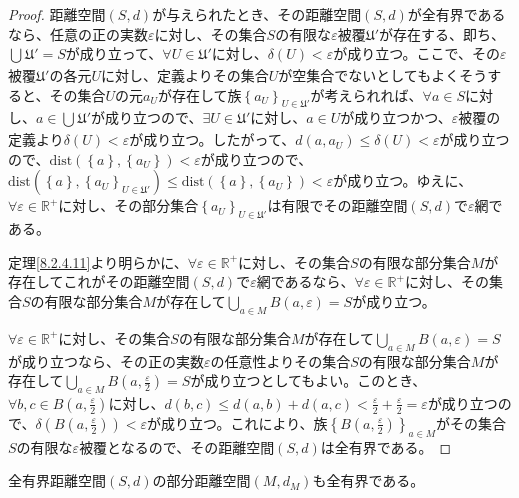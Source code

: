 \documentclass[dvipdfmx]{jsarticle}
\begin{document}
\begin{proof}
距離空間$(S,d)$が与えられたとき、その距離空間$(S,d)$が全有界であるなら、任意の正の実数$\varepsilon$に対し、その集合$S$の有限な$\varepsilon$被覆$\mathfrak{U}'$が存在する、即ち、$\bigcup_{} \mathfrak{U}' = S$が成り立って、$\forall U \in \mathfrak{U}'$に対し、$\delta(U) < \varepsilon$が成り立つ。ここで、その$\varepsilon$被覆$\mathfrak{U}'$の各元$U$に対し、定義よりその集合$U$が空集合でないとしてもよくそうすると、その集合$U$の元$a_{U}$が存在して族$\left\{ a_{U} \right\}_{U \in \mathfrak{U}'}$が考えられれば、$\forall a \in S$に対し、$a \in \bigcup_{} \mathfrak{U}'$が成り立つので、$\exists U \in \mathfrak{U}'$に対し、$a \in U$が成り立つかつ、$\varepsilon$被覆の定義より$\delta(U) < \varepsilon$が成り立つ。したがって、$d\left( a,a_{U} \right) \leq \delta(U) < \varepsilon$が成り立つので、$\mathrm{dist}\left( \left\{ a \right\},\left\{ a_{U} \right\} \right) < \varepsilon$が成り立つので、$\mathrm{dist}\left( \left\{ a \right\},\left\{ a_{U} \right\}_{U \in \mathfrak{U}'} \right) \leq \mathrm{dist}\left( \left\{ a \right\},\left\{ a_{U} \right\} \right) < \varepsilon$が成り立つ。ゆえに、$\forall\varepsilon \in \mathbb{R}^{+}$に対し、その部分集合$\left\{ a_{U} \right\}_{U \in \mathfrak{U}'}$は有限でその距離空間$(S,d)$で$\varepsilon$網である。\par
定理\ref{8.2.4.11}より明らかに、$\forall\varepsilon \in \mathbb{R}^{+}$に対し、その集合$S$の有限な部分集合$M$が存在してこれがその距離空間$(S,d)$で$\varepsilon$網であるなら、$\forall\varepsilon \in \mathbb{R}^{+}$に対し、その集合$S$の有限な部分集合$M$が存在して$\bigcup_{a \in M} {B(a,\varepsilon)} = S$が成り立つ。\par
$\forall\varepsilon \in \mathbb{R}^{+}$に対し、その集合$S$の有限な部分集合$M$が存在して$\bigcup_{a \in M} {B(a,\varepsilon)} = S$が成り立つなら、その正の実数$\varepsilon$の任意性よりその集合$S$の有限な部分集合$M$が存在して$\bigcup_{a \in M} {B\left( a,\frac{\varepsilon}{2} \right)} = S$が成り立つとしてもよい。このとき、$\forall b,c \in B\left( a,\frac{\varepsilon}{2} \right)$に対し、$d(b,c) \leq d(a,b) + d(a,c) < \frac{\varepsilon}{2} + \frac{\varepsilon}{2} = \varepsilon$が成り立つので、$\delta\left( B\left( a,\frac{\varepsilon}{2} \right) \right) < \varepsilon$が成り立つ。これにより、族$\left\{ B\left( a,\frac{\varepsilon}{2} \right) \right\}_{a \in M}$がその集合$S$の有限な$\varepsilon$被覆となるので、その距離空間$(S,d)$は全有界である。
\end{proof}
\begin{thm}\label{8.2.4.13}
全有界距離空間$(S,d)$の部分距離空間$\left( M,d_{M} \right)$も全有界である。
\end{thm}
\end{document}
